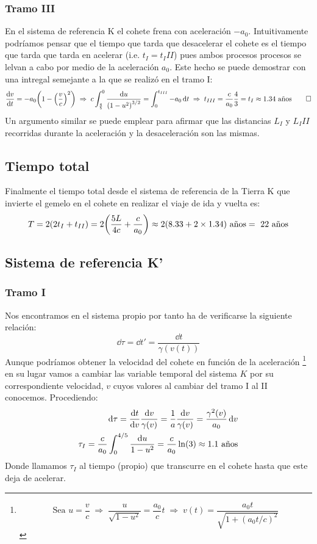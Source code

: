 \documentclass[11pt]{article}
\begin{document}
\subsubsection*{Tramo III} 
En el sistema de referencia K el cohete frena con aceleración $-a_0$. Intuitivamente podríamos pensar que el tiempo que tarda que desacelerar el cohete es el tiempo que tarda que tarda en acelerar (i.e. $t_I = t_III$) pues ambos procesos procesos se lelvan a cabo por medio de la aceleración $a_0$. Este hecho se puede demostrar con una intregal semejante a la que se realizó en el tramo I:
\begin{align*}
    \dv{v}{t} = -a_0 \qty(1 - \qty(\dfrac{v}{c})^2) \;\Rightarrow\; c\int_{\frac{4}{5}}^{0} \dfrac{\dd{u}}{\qty(1-u^2)^{3/2}} = \int_{0}^{t_{III}} -a_0 \dd{t} \;\Rightarrow\; t_{III} = \dfrac{c}{a_0}\dfrac{4}{3} = t_{I} \approx 1.34 \textrm{ años} \qed 
\end{align*}
Un argumento similar se puede emplear para afirmar que las distancias $L_I$ y $L_III$ recorridas durante la aceleración y la desaceleración son las mismas.
\subsection*{Tiempo total}
Finalmente el tiempo total desde el sistema de referencia de la Tierra K que invierte el gemelo en el cohete en realizar el viaje de ida y vuelta es: 
\begin{equation}
    T = 2(2t_I + t_{II}) = 2\qty(\dfrac{5L}{4c}+\dfrac{c}{a_0}) \approx 2(8.33 +2\times1.34) \textrm{ años} =  \textrm{ 22 años} 
\end{equation}
\subsection*{Sistema de referencia K'}
\subsubsection*{Tramo I}
Nos encontramos en el sistema propio por tanto ha de verificarse la siguiente relación: 
\begin{equation}
    \label{Tiempo propio}
    \dd{\tau} = \dd{t'} = \dfrac{\dd{t}}{\gamma(v(t))}
\end{equation}
Aunque podríamos obtener la velocidad del cohete en función de la aceleración \footnote{
    \begin{equation*}
        \textrm{Sea } u = \dfrac{v}{c} \;\Rightarrow\; \dfrac{u}{\sqrt{1-u^2}} = \dfrac{a_0}{c} t \;\Rightarrow\; v(t) = \dfrac{a_0 t}{\sqrt{1 + (a_0 t/c)^2}} 
    \end{equation*}
} en su lugar vamos a cambiar las variable temporal del sistema $K$ por su correspondiente velocidad, $v$ cuyos valores al cambiar del tramo I al II conocemos. Procediendo: 
\begin{align}
    \dd{\tau} = \dv{t}{v} \dfrac{\dd{v}}{\gamma(v)} = \dfrac{1}{a} \dfrac{\dd{v}}{\gamma(v)} = \dfrac{\gamma^2(v)}{a_0}\dd{v}\\
    \tau_I =  \dfrac{c}{a_0}\int_{0}^{4/5} \dfrac{\dd{u}}{1-u^2} = \dfrac{c }{a_0} \ln(3) \approx 1.1 \textrm{ años} 
\end{align} 
Donde llamamos $\tau_I$ al tiempo (propio) que transcurre en el cohete hasta que este deja de acelerar.
\end{document}
